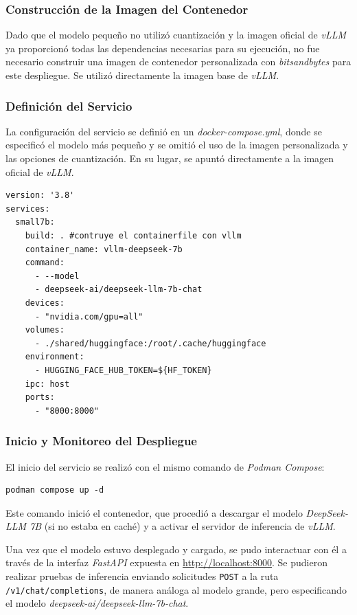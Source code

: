 \subsubsection{Construcción de la Imagen del Contenedor}
Dado que el modelo pequeño no utilizó cuantización y la imagen oficial de \textit{vLLM} ya proporcionó todas las dependencias necesarias para su ejecución, no fue necesario construir una imagen de contenedor personalizada con \textit{bitsandbytes} para este despliegue. Se utilizó directamente la imagen base de \textit{vLLM}.

\subsubsection{Definición del Servicio}
La configuración del servicio se definió en un \textit{docker-compose.yml}, donde se especificó el modelo más pequeño y se omitió el uso de la imagen personalizada y las opciones de cuantización. En su lugar, se apuntó directamente a la imagen oficial de \textit{vLLM}.
\begin{verbatim}
version: '3.8'
services:
  small7b:
    build: . #contruye el containerfile con vllm
    container_name: vllm-deepseek-7b
    command:
      - --model
      - deepseek-ai/deepseek-llm-7b-chat
    devices:
      - "nvidia.com/gpu=all"
    volumes:
      - ./shared/huggingface:/root/.cache/huggingface
    environment:
      - HUGGING_FACE_HUB_TOKEN=${HF_TOKEN}
    ipc: host
    ports:
      - "8000:8000"
\end{verbatim}

\subsubsection{Inicio y Monitoreo del Despliegue}
El inicio del servicio se realizó con el mismo comando de \textit{Podman Compose}:
\begin{verbatim}
podman compose up -d
\end{verbatim}

Este comando inició el contenedor, que procedió a descargar el modelo \textit{DeepSeek-LLM 7B} (si no estaba en caché) y a activar el servidor de inferencia de \textit{vLLM}.

Una vez que el modelo estuvo desplegado y cargado, se pudo interactuar con él a través de la interfaz \textit{FastAPI} expuesta en \url{http://localhost:8000}. Se pudieron realizar pruebas de inferencia enviando solicitudes \texttt{POST} a la ruta \texttt{/v1/chat/completions}, de manera análoga al modelo grande, pero especificando el modelo \textit{deepseek-ai/deepseek-llm-7b-chat}.

